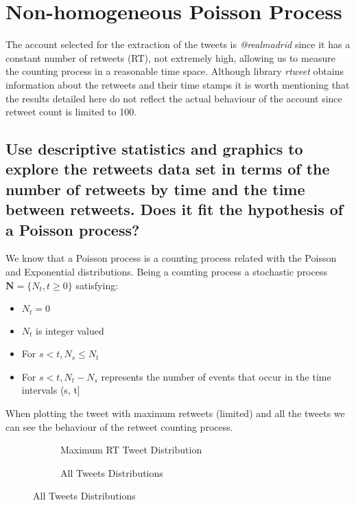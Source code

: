 
\section{Non-homogeneous Poisson Process}

The account selected for the extraction of the tweets is \textit{@realmadrid} since it has a constant number of retweets (RT), not extremely high, allowing us to measure the counting process in a reasonable time space. 
Although library \textit{rtweet} obtains information about the retweets and their time stamps it is worth mentioning that the results detailed here do not reflect the actual behaviour of the account since retweet count is limited to 100.

\subsection{Use descriptive statistics and graphics to explore the retweets data set in terms of the number of retweets by time and the time between retweets. Does it fit the hypothesis of a Poisson process?}

We know that a Poisson process is a counting process related with the Poisson and Exponential distributions. 
Being a counting process a stochastic process $\mathbf{N} = \{ N_t, t \geq 0 \}$ satisfying:
\begin{itemize}
	\item $N_t=0$
	\item $N_t$ is integer valued
	\item For $s<t, N_s \leq N_t$
	\item For $s<t, N_t - N_s$ represents the number of events that occur in the time intervals (s, t]
\end{itemize}

When plotting the tweet with maximum retweets (limited) and all the tweets we can see the behaviour of the retweet counting process.

\begin{figure}[H]
	\centering
	\begin{subfigure}{.5\textwidth}
	  \centering
	  
	  \caption{Maximum RT Tweet Distribution}
	  \label{fig:rtMax}
	\end{subfigure}%
	\begin{subfigure}{.5\textwidth}
	  \centering
	  \vspace*{-3em}
	  
	  \vspace*{-1.4em}
	  \caption{All Tweets Distributions}
	  \label{fig:rtAll}
	\end{subfigure}
\end{figure}

